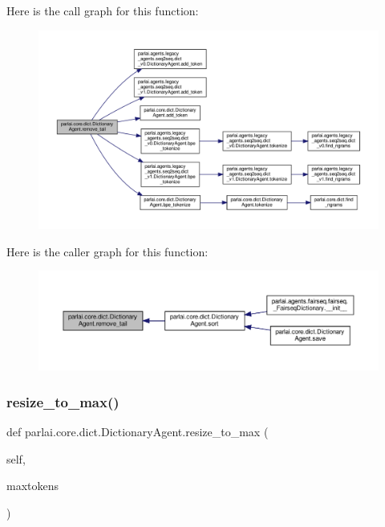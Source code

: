 Here is the call graph for this function\+:
\nopagebreak
\begin{figure}[H]
\begin{center}
\leavevmode
\includegraphics[width=350pt]{classparlai_1_1core_1_1dict_1_1DictionaryAgent_ae828063449b45112d82a97921d35c247_cgraph}
\end{center}
\end{figure}
Here is the caller graph for this function\+:
\nopagebreak
\begin{figure}[H]
\begin{center}
\leavevmode
\includegraphics[width=350pt]{classparlai_1_1core_1_1dict_1_1DictionaryAgent_ae828063449b45112d82a97921d35c247_icgraph}
\end{center}
\end{figure}
\mbox{\label{classparlai_1_1core_1_1dict_1_1DictionaryAgent_a1a800c1aecdb97986c59fd26f1b55626}} 
\subsubsection{\texorpdfstring{resize\+\_\+to\+\_\+max()}{resize\_to\_max()}}
{\footnotesize\ttfamily def parlai.\+core.\+dict.\+Dictionary\+Agent.\+resize\+\_\+to\+\_\+max (\begin{DoxyParamCaption}\item[{}]{self,  }\item[{}]{maxtokens }\end{DoxyParamCaption})}

